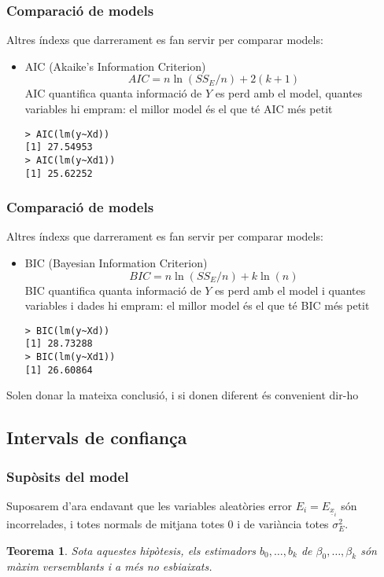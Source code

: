 \documentclass[12pt,t]{beamer}
\renewcommand{\emph}[1]{{\color{red}#1}}
\theoremstyle{plain}
\newtheorem{teorema}{Teorema}
\theoremstyle{definition}
\begin{document}
\begin{frame}[fragile]
\frametitle{Comparació de models}

Altres índexs que darrerament es fan servir per comparar models:
\begin{itemize}
\item \emph{AIC} (\emph{Akaike's Information Criterion})
$$
AIC=n\ln(SS_E/n)+2(k+1)
$$
AIC quantifica quanta informació de $Y$ es perd amb el model, quantes variables hi empram: el millor model és el que té AIC més petit
\begin{verbatim}
> AIC(lm(y~Xd))
[1] 27.54953
> AIC(lm(y~Xd1))
[1] 25.62252
\end{verbatim}
\end{itemize}
\end{frame}



\begin{frame}[fragile]
\frametitle{Comparació de models}

Altres índexs que darrerament es fan servir per comparar models:
\begin{itemize}
\item \emph{BIC} (\emph{Bayesian Information Criterion})
$$
BIC=n\ln(SS_E/n)+k\ln(n)
$$
BIC quantifica quanta informació de $Y$ es perd amb el model i quantes variables i dades hi empram: el millor model és el que té BIC més petit
\begin{verbatim}
> BIC(lm(y~Xd))
[1] 28.73288
> BIC(lm(y~Xd1))
[1] 26.60864
\end{verbatim}
\end{itemize}
Solen donar la mateixa conclusió, i si donen diferent és convenient dir-ho
\end{frame}

\subsection{Intervals de confiança}
\begin{frame}
\frametitle{Supòsits del model}

Suposarem d'ara endavant que les variables aleatòries error $E_i=E_{\underline{x}_{i}}$ són incorrelades, i totes normals de mitjana totes 0 i de variància totes $\sigma_E^2$.
\medskip

\begin{teorema}
Sota aquestes hipòtesis, els estimadors $b_0,\ldots, b_k$ de
$\beta_0,\ldots,\beta_k$ són màxim versemblants i a més no esbiaixats.
\end{teorema}
\end{frame}
\end{document}
